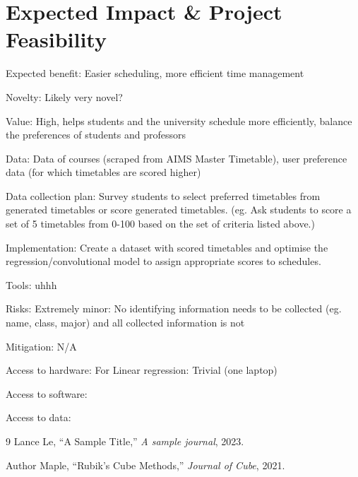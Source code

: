 \documentclass{article}
\begin{document}
\section{Expected Impact \& Project Feasibility}

Expected benefit: Easier scheduling, more efficient time management

Novelty: Likely very novel?

Value: High, helps students and the university schedule more efficiently, balance the preferences of students and professors

Data: Data of courses (scraped from AIMS Master Timetable), user preference data (for which timetables are scored higher)

Data collection plan: Survey students to select preferred timetables from generated timetables or score generated timetables. (eg. Ask students to score a set of 5 timetables from 0-100 based on the set of criteria listed above.)

Implementation: Create a dataset with scored timetables and optimise the regression/convolutional model to assign appropriate scores to schedules.

Tools: uhhh

Risks: Extremely minor: No identifying information needs to be collected (eg. name, class, major) and all collected information is not 

Mitigation: N/A

Access to hardware: For Linear regression: Trivial (one laptop)

Access to software:

Access to data: 

\begin{thebibliography}{9}
\small  
{}
Lance Le, ``A Sample Title,'' \emph{A sample journal}, 2023.

Author Maple, ``Rubik's Cube Methods,'' \emph{Journal of Cube}, 2021.
\end{thebibliography}

\end{document}
